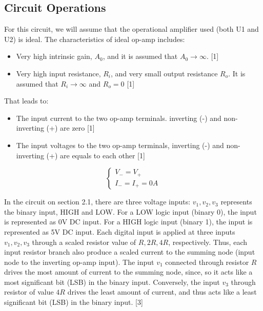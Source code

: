 \documentclass[12pt]{article}
\begin{document}
    \newpage
    \subsection{Circuit Operations}

    For this circuit, we will assume that the operational amplifier used (both U1 and U2) is ideal. The characteristics of ideal op-amp includes: 

    \begin{itemize}
        \item Very high intrinsic gain, \(A_0\), and it is assumed that \(A_0 \to \infty \). [1]
        \item Very high input resistance, \(R_i\), and very small output resistance \(R_o\). It is assumed that \(R_i \to \infty\) and \(R_o=0\) [1]
    \end{itemize}

    That leads to: 
    \begin{itemize}
        \item The input current to the two op-amp terminals. inverting (-) and non-inverting (+) are zero [1]
        \item The input voltages to the two op-amp terminals, inverting (-) and non-inverting (+) are equals to each other [1]
    \end{itemize}

    \begin{equation*}
        \begin{cases}
            V_-=V_+ \\ 
            I_-=I_+=0A
        \end{cases}
    \end{equation*}

    In the circuit on section 2.1, there are three voltage inputs: \(v_1,v_2,v_3\) represents the binary input, HIGH and LOW. For a LOW logic input (binary 0), the input is represented as 0V DC input. For a HIGH logic input (binary 1), the input is represented as 5V DC input. Each digital input is applied at three inputs \(v_1,v_2,v_3\) through a scaled resistor value of \(R,2R,4R\), respectively. Thus, each input resistor branch also produce a scaled current to the summing node (input node to the inverting op-amp input). The input \(v_1\) connected through resistor \(R\) drives the most amount of current to the summing node, since, so it acts like a most significant bit (LSB) in the binary input. Conversely, the input \(v_3\) through resistor of value \(4R\) drives the least amount of current, and thus acts like a least significant bit (LSB) in the binary input. [3]
\end{document}
